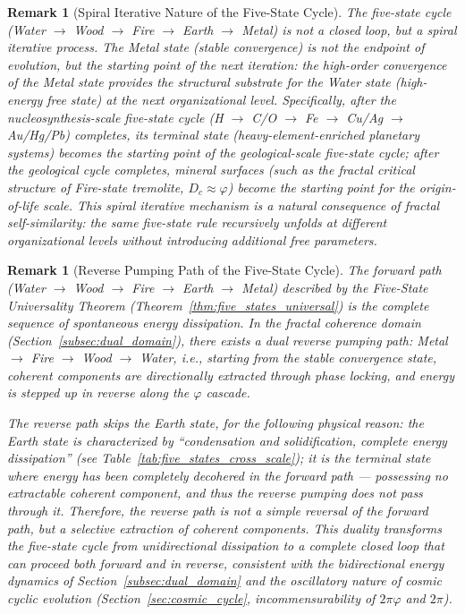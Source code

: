 \documentclass[12pt,a4paper,twocolumn]{article}
\renewcommand{\phi}{\varphi}
\newtheorem{remark}[theorem]{Remark}
\begin{document}
\begin{remark}[Spiral Iterative Nature of the Five-State Cycle]
The five-state cycle (Water $\to$ Wood $\to$ Fire $\to$ Earth $\to$ Metal) is not a closed loop, but a spiral iterative process. The Metal state (stable convergence) is not the endpoint of evolution, but the starting point of the next iteration: the high-order convergence of the Metal state provides the structural substrate for the Water state (high-energy free state) at the next organizational level. Specifically, after the nucleosynthesis-scale five-state cycle (H $\to$ C/O $\to$ Fe $\to$ Cu/Ag $\to$ Au/Hg/Pb) completes, its terminal state (heavy-element-enriched planetary systems) becomes the starting point of the geological-scale five-state cycle; after the geological cycle completes, mineral surfaces (such as the fractal critical structure of Fire-state tremolite, $D_c \approx \phi$) become the starting point for the origin-of-life scale. This spiral iterative mechanism is a natural consequence of fractal self-similarity: the same five-state rule recursively unfolds at different organizational levels without introducing additional free parameters.
\end{remark}

\begin{remark}[Reverse Pumping Path of the Five-State Cycle]
The forward path (Water $\to$ Wood $\to$ Fire $\to$ Earth $\to$ Metal) described by the Five-State Universality Theorem (Theorem~\ref{thm:five_states_universal}) is the complete sequence of spontaneous energy dissipation. In the fractal coherence domain (Section~\ref{subsec:dual_domain}), there exists a dual reverse pumping path: Metal $\to$ Fire $\to$ Wood $\to$ Water, i.e., starting from the stable convergence state, coherent components are directionally extracted through phase locking, and energy is stepped up in reverse along the $\phi$ cascade.

The reverse path skips the Earth state, for the following physical reason: the Earth state is characterized by ``condensation and solidification, complete energy dissipation'' (see Table~\ref{tab:five_states_cross_scale}); it is the terminal state where energy has been completely decohered in the forward path --- possessing no extractable coherent component, and thus the reverse pumping does not pass through it. Therefore, the reverse path is not a simple reversal of the forward path, but a selective extraction of coherent components. This duality transforms the five-state cycle from unidirectional dissipation to a complete closed loop that can proceed both forward and in reverse, consistent with the bidirectional energy dynamics of Section~\ref{subsec:dual_domain} and the oscillatory nature of cosmic cyclic evolution (Section~\ref{sec:cosmic_cycle}, incommensurability of $2\pi\phi$ and $2\pi$).
\end{remark}
\end{document}
